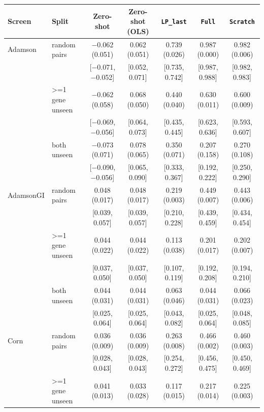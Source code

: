 \begin{tabular}{ll|ccccc}
\hline
Screen & Split & Zero-shot & Zero-shot (OLS) & \texttt{LP\_last} & \texttt{Full} & \texttt{Scratch} \\
\hline
Adamson & random pairs & $-$0.062 (0.051) & 0.062 (0.051) & 0.739 (0.026) & 0.987 (0.000) & 0.982 (0.006) \\
 & & \scriptsize[$-$0.071, $-$0.052] & \scriptsize[0.052, 0.071] & \scriptsize[0.735, 0.742] & \scriptsize[0.987, 0.988] & \scriptsize[0.982, 0.983] \\
 & >=1 gene unseen & $-$0.062 (0.058) & 0.068 (0.050) & 0.440 (0.040) & 0.630 (0.011) & 0.600 (0.009) \\
 & & \scriptsize[$-$0.069, $-$0.056] & \scriptsize[0.064, 0.073] & \scriptsize[0.435, 0.445] & \scriptsize[0.623, 0.636] & \scriptsize[0.593, 0.607] \\
 & both unseen & $-$0.073 (0.071) & 0.078 (0.065) & 0.350 (0.071) & 0.207 (0.158) & 0.270 (0.108) \\
 & & \scriptsize[$-$0.090, $-$0.056] & \scriptsize[0.065, 0.090] & \scriptsize[0.333, 0.367] & \scriptsize[0.192, 0.222] & \scriptsize[0.250, 0.290] \\
\hline
AdamsonGI & random pairs & 0.048 (0.017) & 0.048 (0.017) & 0.219 (0.003) & 0.449 (0.007) & 0.443 (0.006) \\
 & & \scriptsize[0.039, 0.057] & \scriptsize[0.039, 0.057] & \scriptsize[0.210, 0.228] & \scriptsize[0.439, 0.459] & \scriptsize[0.434, 0.454] \\
 & >=1 gene unseen & 0.044 (0.022) & 0.044 (0.022) & 0.113 (0.038) & 0.201 (0.017) & 0.202 (0.007) \\
 & & \scriptsize[0.037, 0.050] & \scriptsize[0.037, 0.050] & \scriptsize[0.107, 0.119] & \scriptsize[0.192, 0.208] & \scriptsize[0.194, 0.210] \\
 & both unseen & 0.044 (0.031) & 0.044 (0.031) & 0.063 (0.046) & 0.044 (0.031) & 0.066 (0.023) \\
 & & \scriptsize[0.025, 0.064] & \scriptsize[0.025, 0.064] & \scriptsize[0.043, 0.082] & \scriptsize[0.025, 0.064] & \scriptsize[0.048, 0.085] \\
\hline
Corn & random pairs & 0.036 (0.009) & 0.036 (0.009) & 0.263 (0.008) & 0.466 (0.002) & 0.460 (0.003) \\
 & & \scriptsize[0.028, 0.043] & \scriptsize[0.028, 0.043] & \scriptsize[0.254, 0.272] & \scriptsize[0.456, 0.475] & \scriptsize[0.450, 0.469] \\
 & >=1 gene unseen & 0.041 (0.013) & 0.033 (0.028) & 0.117 (0.015) & 0.217 (0.014) & 0.225 (0.003) \\

\end{tabular}
